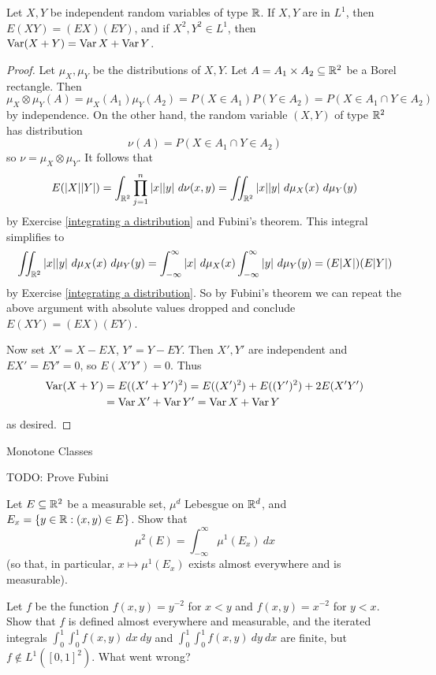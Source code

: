 \begin{corollary}
Let $X,Y$ be independent random variables of type $\mathbb{R}$. If $X,Y$ are in $L^1$, then $E(XY) = (EX)(EY)$, and if $X^2, Y^2 \in L^1$, then $\operatorname{Var}(X+Y) = \operatorname{Var} X + \operatorname{Var} Y$.
\end{corollary}
\begin{proof}
Let $\mu_X,\mu_Y$ be the distributions of $X,Y$.
Let $A = A_1 \times A_2 \subseteq \mathbb{R}^2$ be a Borel rectangle.
Then
$$\mu_X \otimes \mu_Y(A) = \mu_X(A_1) \mu_Y(A_2) = P(X \in A_1) P(Y \in A_2) = P(X \in A_1 \cap Y \in A_2)$$
by independence. On the other hand, the random variable $(X, Y)$ of type $\mathbb{R}^2$ has distribution
$$\nu(A) = P(X \in A_1 \cap Y \in A_2)$$
so $\nu = \mu_X \otimes \mu_Y$.
It follows that
$$E(|X||Y|) = \int_{\mathbb{R}^2} \prod_{j=1}^n |x||y| ~d\nu(x, y) = \iint_{\mathbb{R}^2} |x||y| ~d\mu_X(x)~d\mu_Y(y)$$
by Exercise \ref{integrating a distribution} and Fubini's theorem. This integral simplifies to
$$\iint_{\mathbb{R}^2} |x||y| ~d\mu_X(x)~d\mu_Y(y) = \int_{-\infty}^\infty |x| ~d\mu_X(x) \int_{-\infty}^\infty |y| ~d\mu_Y(y) = (E|X|)(E|Y|)$$
by Exercise \ref{integrating a distribution}.
So by Fubini's theorem we can repeat the above argument with absolute values dropped and conclude $E(XY) = (EX)(EY)$.

Now set $X' = X - EX$, $Y' = Y - EY$. Then $X',Y'$ are independent and $EX' = EY' = 0$, so $E(X'Y') = 0$.
Thus
\begin{align*}\operatorname{Var}(X + Y) &= E((X' + Y')^2) = E((X')^2) + E((Y')^2) + 2E(X'Y') \\
&= \operatorname{Var} X' + \operatorname{Var} Y' = \operatorname{Var} X + \operatorname{Var} Y
\end{align*}
as desired.
\end{proof}

Monotone Classes

TODO: Prove Fubini

\begin{exercise}
Let $E \subseteq \mathbb{R}^2$ be a measurable set, $\mu^d$ Lebesgue on $\mathbb{R}^d$, and $E_x = \{y \in \mathbb{R}: (x, y) \in E\}$.
Show that
$$\mu^2(E) = \int_{-\infty}^\infty \mu^1(E_x)~dx$$
(so that, in particular, $x \mapsto \mu^1(E_x)$ exists almost everywhere and is measurable).
\end{exercise}

\begin{exercise}
Let $f$ be the function $f(x, y) = y^{-2}$ for $x < y$ and $f(x, y) = x^{-2}$ for $y < x$.
Show that $f$ is defined almost everywhere and measurable, and the iterated integrals $\int_0^1\int_0^1 f(x,y)~dx~dy$ and $\int_0^1\int_0^1 f(x,y)~dy~dx$ are finite, but $f \notin L^1([0, 1]^2)$.
What went wrong?
\end{exercise}

